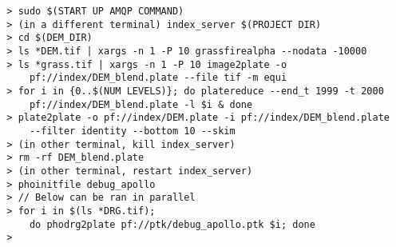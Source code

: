 \begin{verbatim}
  > sudo $(START UP AMQP COMMAND)
  > (in a different terminal) index_server $(PROJECT DIR)
  > cd $(DEM_DIR)
  > ls *DEM.tif | xargs -n 1 -P 10 grassfirealpha --nodata -10000
  > ls *grass.tif | xargs -n 1 -P 10 image2plate -o
      pf://index/DEM_blend.plate --file tif -m equi
  > for i in {0..$(NUM LEVELS)}; do platereduce --end_t 1999 -t 2000
      pf://index/DEM_blend.plate -l $i & done
  > plate2plate -o pf://index/DEM.plate -i pf://index/DEM_blend.plate
      --filter identity --bottom 10 --skim
  > (in other terminal, kill index_server)
  > rm -rf DEM_blend.plate
  > (in other terminal, restart index_server)
  > phoinitfile debug_apollo
  > // Below can be ran in parallel
  > for i in $(ls *DRG.tif);
      do phodrg2plate pf://ptk/debug_apollo.ptk $i; done
  > 
\end{verbatim}
